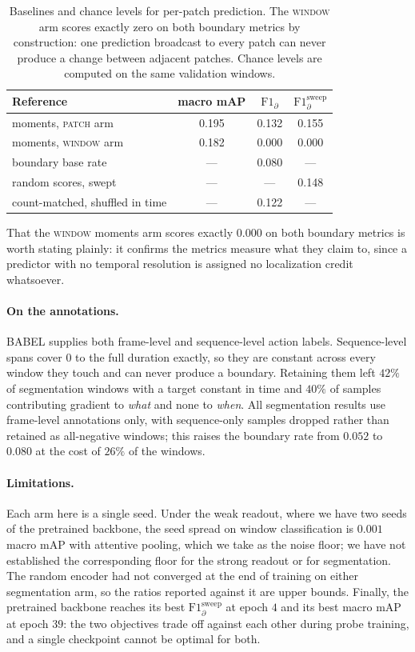 \begin{table}[t]
\centering
\small
\begin{tabular}{lccc}
\toprule
Reference & macro mAP & $\text{F1}_\partial$ & $\text{F1}_\partial^{\text{sweep}}$ \\
\midrule
moments, \textsc{patch} arm    & 0.195 & 0.132 & 0.155 \\
moments, \textsc{window} arm   & 0.182 & 0.000 & 0.000 \\
\midrule
boundary base rate             & --- & 0.080 & --- \\
random scores, swept           & --- & --- & 0.148 \\
count-matched, shuffled in time& --- & 0.122 & --- \\
\bottomrule
\end{tabular}
\caption{Baselines and chance levels for per-patch prediction. The \textsc{window} arm
scores exactly zero on both boundary metrics by construction: one prediction broadcast
to every patch can never produce a change between adjacent patches. Chance levels are
computed on the same validation windows.}
\label{tab:segfloors}
\end{table}

That the \textsc{window} moments arm scores exactly $0.000$ on both boundary metrics is
worth stating plainly: it confirms the metrics measure what they claim to, since a
predictor with no temporal resolution is assigned no localization credit whatsoever.

\paragraph{On the annotations.}
BABEL supplies both frame-level and sequence-level action labels. Sequence-level spans
cover $0$ to the full duration exactly, so they are constant across every window they
touch and can never produce a boundary. Retaining them left $42\%$ of segmentation
windows with a target constant in time and $40\%$ of samples contributing gradient to
\emph{what} and none to \emph{when}. All segmentation results use frame-level
annotations only, with sequence-only samples dropped rather than retained as
all-negative windows; this raises the boundary rate from $0.052$ to $0.080$ at the cost
of $26\%$ of the windows.

\paragraph{Limitations.}
Each arm here is a single seed. Under the weak readout, where we have two seeds of the
pretrained backbone, the seed spread on window classification is $0.001$ macro mAP with
attentive pooling, which we take as the noise floor; we have not established the
corresponding floor for the strong readout or for segmentation. The random encoder had
not converged at the end of training on either segmentation arm, so the ratios reported
against it are upper bounds. Finally, the pretrained backbone reaches its best
$\text{F1}_\partial^{\text{sweep}}$ at epoch $4$ and its best macro mAP at epoch $39$:
the two objectives trade off against each other during probe training, and a single
checkpoint cannot be optimal for both.
